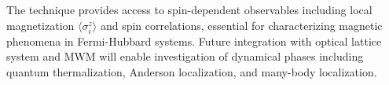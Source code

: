 The technique provides access to spin-dependent observables including local magnetization $\langle \sigma^z_i \rangle$ and spin correlations, essential for characterizing magnetic phenomena in Fermi-Hubbard systems. 
Future integration with optical lattice system and MWM will enable
investigation of dynamical phases including quantum thermalization, Anderson localization, and many-body localization. 
